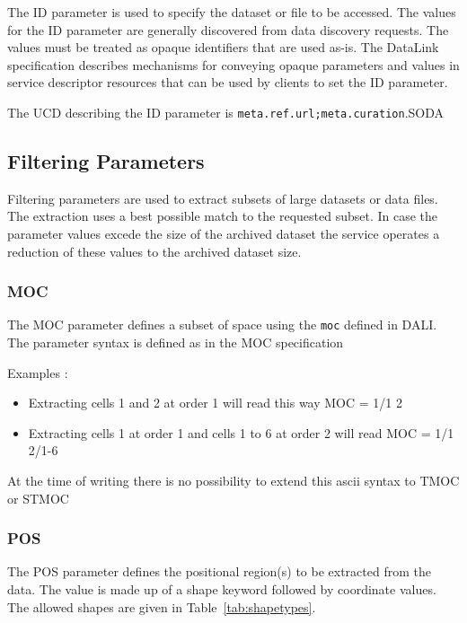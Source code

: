\documentclass[11pt,a4paper]{ivoa}
\newcommand{\xtype}[1]{\texttt{#1}}
\newcommand{\ucd}[1]{\texttt{#1}}
\begin{document}
The ID parameter is used to specify the dataset or file to
be accessed. The values for the ID parameter are generally
discovered from data discovery requests. The
values must be treated as opaque identifiers that are used
as-is. The DataLink specification describes mechanisms
for conveying opaque parameters and values in service
descriptor resources that can be used by clients to set the
ID parameter.

The UCD describing the ID parameter is
\ucd{meta.ref.url;meta.curation}.SODA

\subsection{Filtering Parameters}

Filtering parameters are used to extract subsets of large
datasets or data files. The extraction uses a best possible match to the requested subset. In case the parameter values excede the size of the archived dataset  the service operates a reduction of these values to the archived dataset size.

\subsubsection{MOC}
The MOC parameter defines a subset of space using the \xtype{moc} defined in DALI. The parameter syntax is defined as in the MOC specification \citep{MOC2}

Examples :
\begin{itemize}

\item Extracting cells 1 and 2 at order 1 will read this way MOC = 1/1 2
\item Extracting cells 1 at order 1 and cells 1 to 6 at order 2 will read MOC = 1/1 2/1-6

\end{itemize}


At the time of writing there is no possibility to extend this ascii syntax to TMOC or STMOC

\subsubsection{POS}
\label{sec:POS}

The POS parameter defines the positional region(s) to be
extracted from the data. The value is made up of a shape
keyword followed by coordinate values. The
allowed shapes are given in Table~\ref{tab:shapetypes}.
\end{document}
